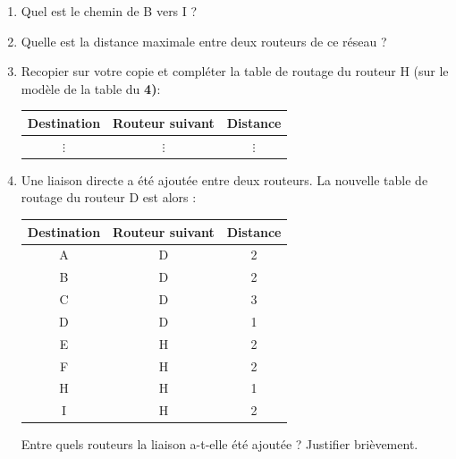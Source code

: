 \documentclass[11pt,a4paper,french,twoside]{PMCours}
\begin{document}
\begin{enumerate}
    \item Quel est le chemin de B vers I ?
    \item Quelle est la distance maximale entre deux routeurs de ce réseau ? 
    \item Recopier sur votre copie et compléter la table de routage du routeur H (sur le modèle de la table du {\bf 4)}:
    \begin{center}
        \begin{tabular}{|c|c|c|}\hline
            Destination&Routeur suivant&Distance\\ \hline
            $\vdots$ &$\vdots$&$\vdots$\\ \hline
            
        \end{tabular}
    \end{center}
    \item Une liaison directe a été ajoutée entre deux routeurs.
    La nouvelle table de routage du routeur D est alors :
    \begin{center}
        \begin{tabular}{|c|c|c|}\hline
            Destination&Routeur suivant&Distance\\ \hline
            A&D &2 \\ \hline 
            B&D &2 \\ \hline 
            C&D &3 \\ \hline 
            D&D &1 \\ \hline 
            E&H &2 \\ \hline 
            F&H &2 \\ \hline  
            H&H &1 \\ \hline
            I&H &2 \\ \hline
 \end{tabular}
    \end{center}
    Entre quels routeurs la liaison a-t-elle été ajoutée ? Justifier brièvement.
\end{enumerate}

\newpage
\end{document}
